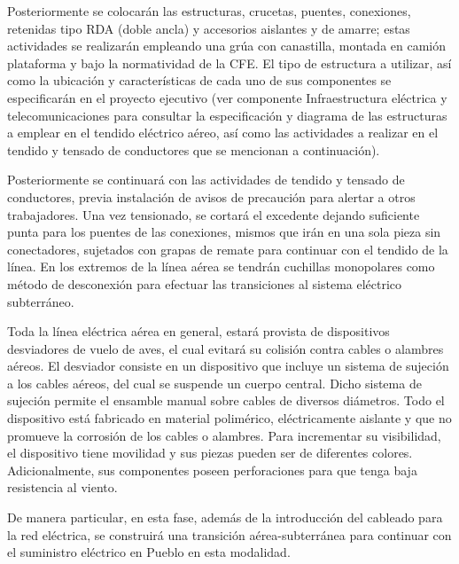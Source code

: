 \documentclass{article}
\begin{document}
\bigskip

Posteriormente se colocarán las estructuras, crucetas, puentes, conexiones, retenidas tipo RDA (doble ancla) y accesorios aislantes y de amarre; estas actividades se realizarán empleando una grúa con canastilla, montada en camión plataforma y bajo la normatividad de la CFE. El tipo de estructura a utilizar, así como la ubicación y características de cada uno de sus componentes se especificarán en el proyecto ejecutivo (ver componente Infraestructura eléctrica y telecomunicaciones para consultar la especificación y diagrama de las estructuras a emplear en el tendido eléctrico aéreo, así como las actividades a realizar en el tendido y tensado de conductores que se mencionan a continuación).


\bigskip

Posteriormente se continuará con las actividades de tendido y tensado de conductores, previa instalación de avisos de precaución para alertar a otros trabajadores. Una vez tensionado, se cortará el excedente dejando suficiente punta para los puentes de las conexiones, mismos que irán en una sola pieza sin conectadores, sujetados con grapas de remate para continuar con el tendido de la línea. En los extremos de la línea aérea se tendrán cuchillas monopolares como método de desconexión para efectuar las transiciones al sistema eléctrico subterráneo. 


\bigskip

Toda la línea eléctrica aérea en general, estará provista de dispositivos desviadores de vuelo de aves, el cual evitará su colisión contra cables o alambres aéreos. El desviador consiste en un dispositivo que incluye un sistema de sujeción a los cables aéreos, del cual se suspende un cuerpo central. Dicho sistema de sujeción permite el ensamble manual sobre cables de diversos diámetros. Todo el dispositivo está fabricado en material polimérico, eléctricamente aislante y que no promueve la corrosión de los cables o alambres. Para incrementar su visibilidad, el dispositivo tiene movilidad y sus piezas pueden ser de diferentes colores. Adicionalmente, sus componentes poseen perforaciones para que tenga baja resistencia al viento.


\bigskip

De manera particular, en esta fase, además de la introducción del cableado para la red eléctrica, se construirá una transición aérea-subterránea para continuar con el suministro eléctrico en Pueblo en esta modalidad.


\bigskip
\end{document}
